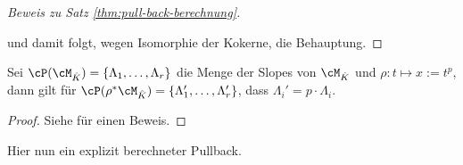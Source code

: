 \begin{proof}[Beweis zu Satz \ref{thm:pull-back-berechnung}]
\begin{center}
\end{center}
und damit folgt, wegen Isomorphie der Kokerne, die Behauptung.
\end{proof}
%
\begin{lem}\label{lem:slope-pb-multiplikation}
Sei $\cP(\cM_{\hat K})=\{\Lambda_1,\dots,\Lambda_r\}$ die Menge der Slopes von
$\cM_{\hat K}$ und $\rho:t\mapsto x:=t^p$, dann gilt für $\cP(\rho^*\cM_{\hat
K})=\{\Lambda_1',\dots,\Lambda_r'\}$, dass $\Lambda_i'=p\cdot\Lambda_i$.
\end{lem}
\begin{proof}
Siehe \cite[5.4.3]{sabbah_cimpa90} für einen Beweis.
\end{proof}
\begin{comment}
\begin{proof}
Sei $\cM_{\hat K}=\cD_{\hat K}\slash \cD_{\hat K}\cdot P$ mit $P=\sum
a_i(x)\partial_x^i$, dann ist
$\rho^*\cM_{\hat K}\cong\cD_{\hat L}\slash \cD_{\hat L}\cdot P'$ mit
\begin{align*}
H(P'(t,\partial_t)) &=H(P(\rho(t),\rho'(t)^{-1}\partial_t))
\\&=H(\sum_i a_i(\rho(t))(\rho'(t)^{-1}\partial_t)^ii)
\\&=H(\sum_i a_i(\rho(t))(\rho'(t)^{-1}\partial_t)^ii)
\\&=H(\sum_i a_i(t^p)((p\cdot t^{p-1})^{-1}\partial_t)^i)
\\&=H(\sum_i a_i(t^p)(p\cdot t^{p-1})^{-i}\partial_t^i)
\\&=H(\sum_i a_i(t^p)t^{-i(p-1)}\partial_t^i)
\\&=\dots %
\end{align*}
\end{proof}
\end{comment}
%
Hier nun ein explizit berechneter Pullback.

